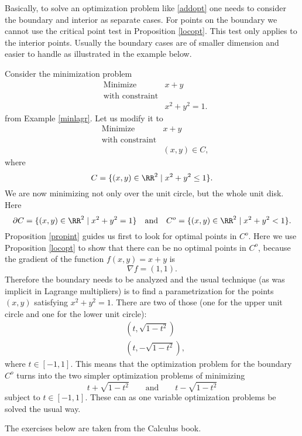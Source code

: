 \documentclass{article}
\begin{document}
Basically, to solve an optimization problem like \eqref{addopt} one needs to
consider the boundary and interior as separate cases. For points on
the boundary we cannot use the critical point test in Proposition \ref{locopt}.
This test only applies to the interior points. Usually the boundary cases
are of smaller dimension and easier to handle as illustrated in the example below.



\begin{example}
    Consider the minimization  problem
\begin{align*}
    &\text{Minimize} &x+y\\
    &\text{with constraint}\\
    &&x^2 + y^2 = 1.
  \end{align*}
  from Example \ref{minlagr}. Let us modify it to
\begin{align}\label{minmodif}
    &\text{Minimize} &x+y\\
    &\text{with constraint}\\
    &&(x, y)\in C,
\end{align}
where
$$
C=\{(x, y)\in \RR^2 \mid x^2 + y^2\leq  1\}.
$$
We are now minimizing not only over the unit circle, but
the whole unit disk. Here
$$
\partial C = \{(x, y)\in \RR^2 \mid x^2 + y^2 = 1\}\quad
\text{and}\quad
C^o = \{(x, y)\in \RR^2 \mid x^2 + y^2 < 1\}.
$$
Proposition \ref{propint} guides us first to look for
optimal points in $C^o$. Here we use Proposition \ref{locopt} to
show that there can be no optimal points in $C^o$, because
the gradient of the function $f(x, y) = x + y$ is
$$
\nabla f = (1, 1).
$$
Therefore the boundary needs to be analyzed and the usual technique
(as was implicit in Lagrange multipliers) is to find
a parametrization for the points $(x, y)$ satisfying
$x^2 + y^2 = 1$. There are two of those (one for the upper unit circle and one for the lower unit circle):
\begin{align*}
  &\left(t, \sqrt{1 - t^2}\right)\\
  &\left(t, -\sqrt{1 - t^2}\right),
\end{align*}
where $t\in [-1, 1]$.
This means that the optimization problem for the boundary $C^o$ turns into the two
simpler optimization problems of minimizing
$$
t + \sqrt{1 - t^2}\qquad \text{and}\qquad t - \sqrt{1 - t^2}
$$
subject to $t\in [-1, 1]$. These can as one variable optimization problems be solved the usual way.
\end{example}


The
exercises below are taken from the Calculus book.
\end{document}
